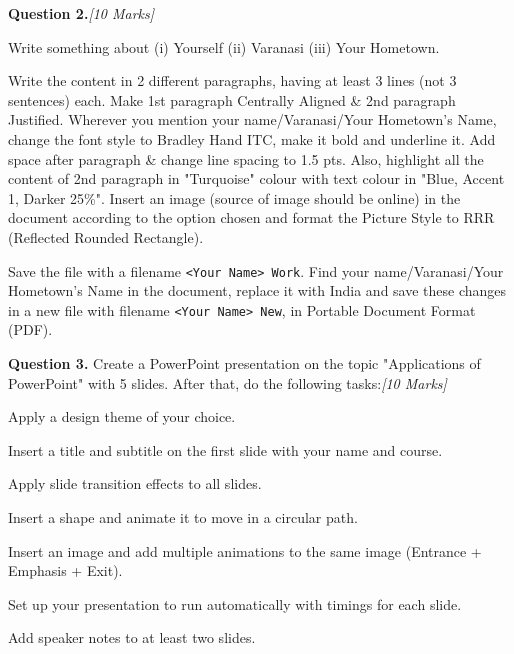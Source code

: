 \documentclass[11pt,a4paper]{article}
\newcommand{\pts}[1]{\hfill   \textit{[#1]}}
\begin{document}
\bigskip



\noindent   \textbf{Question 2.}\pts{10 Marks}

\begin{parts}
  \item Write something about (i) Yourself (ii) Varanasi (iii) Your Hometown.
  \item Write the content in 2 different paragraphs, having at least 3 lines (not 3 sentences) each. Make 1st paragraph Centrally Aligned \& 2nd paragraph Justified. Wherever you mention your name/Varanasi/Your Hometown's Name, change the font style to Bradley Hand ITC, make it bold and underline it. Add space after paragraph \& change line spacing to 1.5 pts. Also, highlight all the content of 2nd paragraph in "Turquoise" colour with text colour in "Blue, Accent 1, Darker 25\%". Insert an image (source of image should be online) in the document according to the option chosen and format the Picture Style to RRR (Reflected Rounded Rectangle).
  \item Save the file with a filename   \texttt{<Your Name> Work}. Find your name/Varanasi/Your Hometown's Name in the document, replace it with India and save these changes in a new file with filename   \texttt{<Your Name> New}, in Portable Document Format (PDF).
\end{parts}

\bigskip



\noindent   \textbf{Question 3.} Create a PowerPoint presentation on the topic "Applications of PowerPoint" with 5 slides. After that, do the following tasks:\pts{10 Marks}

\begin{parts}
  \item Apply a design theme of your choice.
  \item Insert a title and subtitle on the first slide with your name and course.
  \item Apply slide transition effects to all slides.
  \item Insert a shape and animate it to move in a circular path.
  \item Insert an image and add multiple animations to the same image (Entrance + Emphasis + Exit).
  \item Set up your presentation to run automatically with timings for each slide.
  \item Add speaker notes to at least two slides.
\end{parts}
\end{document}
